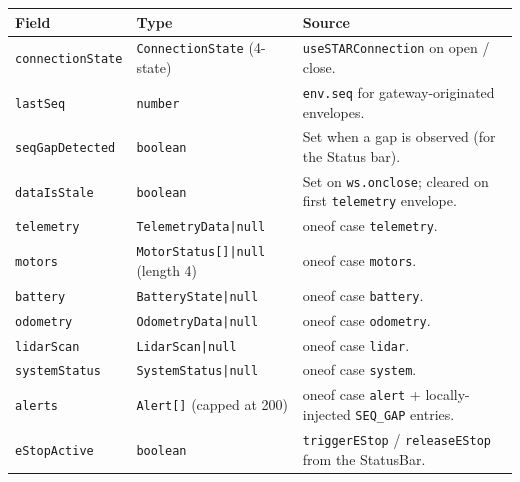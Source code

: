 \begin{center}
\begin{tabular}{|p{3.6cm}|p{4.0cm}|p{6.7cm}|}
\hline
\textbf{Field}              & \textbf{Type}                            & \textbf{Source}                                                          \\
\hline
\texttt{connectionState}    & \texttt{ConnectionState} (4-state)       & \texttt{useSTARConnection} on open / close.                              \\
\texttt{lastSeq}            & \texttt{number}                          & \texttt{env.seq} for gateway-originated envelopes.                       \\
\texttt{seqGapDetected}     & \texttt{boolean}                         & Set when a gap is observed (for the Status bar).                          \\
\texttt{dataIsStale}        & \texttt{boolean}                         & Set on \texttt{ws.onclose}; cleared on first \texttt{telemetry} envelope. \\
\texttt{telemetry}          & \texttt{TelemetryData|null}              & oneof case \texttt{telemetry}.                                            \\
\texttt{motors}             & \texttt{MotorStatus[]|null} (length 4)   & oneof case \texttt{motors}.                                               \\
\texttt{battery}            & \texttt{BatteryState|null}               & oneof case \texttt{battery}.                                              \\
\texttt{odometry}           & \texttt{OdometryData|null}               & oneof case \texttt{odometry}.                                             \\
\texttt{lidarScan}          & \texttt{LidarScan|null}                  & oneof case \texttt{lidar}.                                                \\
\texttt{systemStatus}       & \texttt{SystemStatus|null}               & oneof case \texttt{system}.                                               \\
\texttt{alerts}             & \texttt{Alert[]} (capped at 200)         & oneof case \texttt{alert} + locally-injected \texttt{SEQ\_GAP} entries.   \\
\texttt{eStopActive}        & \texttt{boolean}                         & \texttt{triggerEStop} / \texttt{releaseEStop} from the StatusBar.         \\
\hline
\end{tabular}
\end{center}

